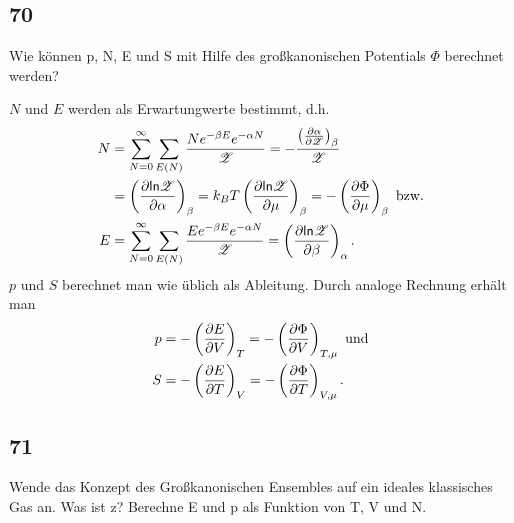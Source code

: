 \subsection{70}
\begin{myfrag}
Wie können p, N, E und S mit Hilfe des großkanonischen Potentials $\Phi$
berechnet werden?
\end{myfrag}
$N$ und $E$ werden als Erwartungwerte bestimmt, d.h.
\begin{align}
	N&=\sum\limits_{N=0}^\infty\sum\limits_{E(N)}\frac{Ne^{-\beta E}e^{-\alpha N}}{\mathscr{Z}}=-\frac{\left(\frac{\partial \alpha}{\partial \mathscr{Z}}\right)_{\beta}}{\mathscr{Z}}\nonumber\\
	&=\left(\frac{\partial \mathsf{ln} \mathscr{Z}}{\partial \alpha}\right)_{\beta}=k_BT\left(\frac{\partial \mathsf{ln} \mathscr{Z}}{\partial \mu}\right)_{\beta}=-\left(\frac{\partial \Phi}{\partial \mu}\right)_{\beta}\text{ bzw.}\\
	E&=\sum\limits_{N=0}^\infty\sum\limits_{E(N)}\frac{Ee^{-\beta E}e^{-\alpha N}}{\mathscr{Z}}=\left(\frac{\partial \mathsf{ln} \mathscr{Z}}{\partial \beta}\right)_{\alpha}.
\end{align}
$p$ und $S$ berechnet man wie üblich als Ableitung. Durch analoge Rechnung erhält man
\begin{align}
	p&=-\left(\frac{\partial E}{\partial V}\right)_{T}=-\left(\frac{\partial \Phi}{\partial V}\right)_{T,\mu}\text{ und}\\
	S&=-\left(\frac{\partial E}{\partial T}\right)_{V}=-\left(\frac{\partial \Phi}{\partial T}\right)_{V,\mu}.
\end{align}
\subsection{71}
\begin{myfrag}
Wende das Konzept des Großkanonischen Ensembles auf ein ideales
klassisches Gas an. Was ist z? Berechne E und p als Funktion von T, V und
N.
\end{myfrag}
